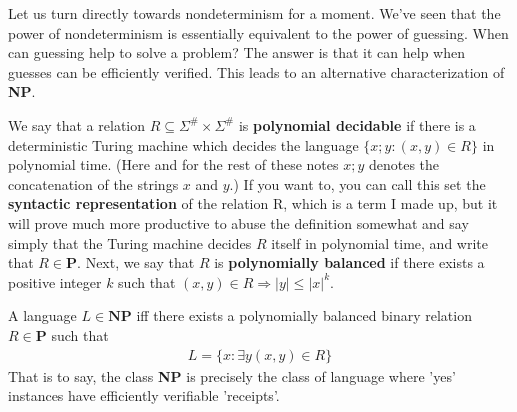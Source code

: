 \par Let us turn directly towards nondeterminism for a moment. We've seen that the power of nondeterminism is essentially equivalent to the power of guessing. When can guessing help to solve a problem? The answer is that it can help when guesses can be efficiently verified. This leads to an alternative characterization of \textbf{NP}. 
\begin{definition}
    We say that a relation $R \subseteq \Sigma^{\#} \times \Sigma^{\#}$ is \textbf{polynomial decidable} if there is a deterministic Turing machine which decides the language $\{x;y: (x,y) \in R\}$ in polynomial time. (Here and for the rest of these notes $x;y$ denotes the concatenation of the strings $x$ and $y$.) If you want to, you can call this set the \textbf{syntactic representation} of the relation R, which is a term I made up, but it will prove much more productive to abuse the definition somewhat and say simply that the Turing machine decides $R$ itself in polynomial time, and write that $R \in \textbf{P}$. Next, we say that $R$ is \textbf{polynomially balanced} if there exists a positive integer $k$ such that $(x,y) \in R \Rightarrow |y| \leq |x|^k$.
\end{definition}
\begin{theorem} 
    A language $L \in \textbf{NP}$ iff there exists a polynomially balanced binary relation $R \in \textbf{P}$ such that 
    \begin{align}
        L = \{x: \exists y (x,y) \in R \}
    \end{align}
    That is to say, the class \textbf{NP} is precisely the class of language where 'yes' instances have efficiently verifiable 'receipts'.
\end{theorem}

